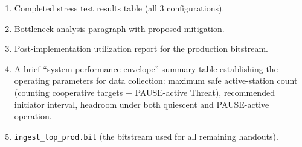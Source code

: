 \documentclass[11pt,letterpaper]{article}
\begin{document}
\begin{tcolorbox}[deliverable={Lab Handout 3-E Deliverable}]
	\begin{enumerate}[leftmargin=1.2em]
		\item Completed stress test results table (all 3 configurations).
		\item Bottleneck analysis paragraph with proposed mitigation.
		\item Post-implementation utilization report for the production bitstream.
		\item A brief ``system performance envelope'' summary table establishing the operating parameters for data collection: maximum safe active-station count (counting cooperative targets + PAUSE-active Threat), recommended initiator interval, \FIFO{} headroom under both quiescent and PAUSE-active operation.
		\item \texttt{ingest\_top\_prod.bit} (the bitstream used for all remaining handouts).
	\end{enumerate}
\end{tcolorbox}

\printhandoutglossary
\end{document}
